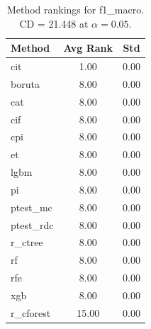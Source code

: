 \begin{table}[h]
\centering
\caption{Method rankings for f1_macro. CD = 21.448 at $\alpha=0.05$.}
\label{tab:ranks_f1_macro}
\begin{tabular}{lcc}
\toprule
Method & Avg Rank & Std \\
\midrule
cit & 1.00 & 0.00 \\
boruta & 8.00 & 0.00 \\
cat & 8.00 & 0.00 \\
cif & 8.00 & 0.00 \\
cpi & 8.00 & 0.00 \\
et & 8.00 & 0.00 \\
lgbm & 8.00 & 0.00 \\
pi & 8.00 & 0.00 \\
ptest_mc & 8.00 & 0.00 \\
ptest_rdc & 8.00 & 0.00 \\
r_ctree & 8.00 & 0.00 \\
rf & 8.00 & 0.00 \\
rfe & 8.00 & 0.00 \\
xgb & 8.00 & 0.00 \\
r_cforest & 15.00 & 0.00 \\
\bottomrule
\end{tabular}
\end{table}